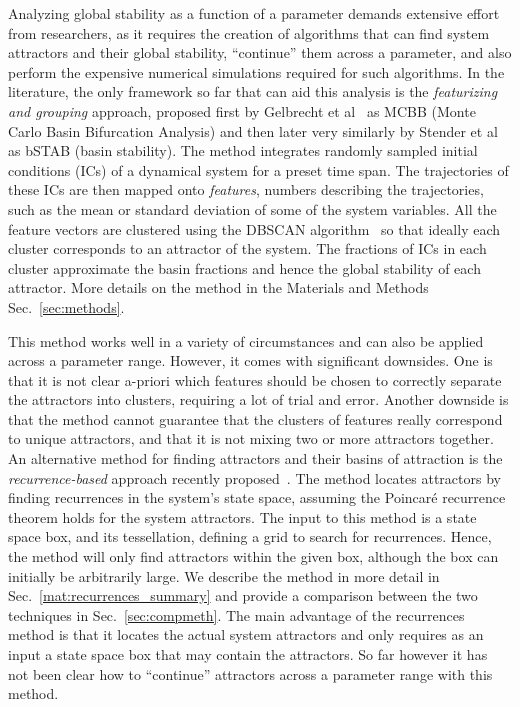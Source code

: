 \documentclass[%
 aip,
 amsmath,amssymb,
 reprint,%
]{revtex4-1}
\begin{document}
Analyzing global stability as a function of a parameter demands extensive effort from researchers, as it requires the creation of algorithms that can find system attractors and their global stability, ``continue'' them across a parameter, and also perform the expensive numerical simulations required for such algorithms. In the literature, the only framework so far that can aid this analysis is the \emph{featurizing and grouping} approach, proposed first by Gelbrecht et al~\cite{Gelbrecht2020} as MCBB (Monte Carlo Basin Bifurcation Analysis) and then later very similarly by Stender et al~\cite{Stender2021} as bSTAB (basin stability). The method integrates randomly sampled initial conditions (ICs) of a dynamical system for a preset time span. The trajectories of these ICs are then mapped onto \emph{features}, numbers describing the trajectories, such as the mean or standard deviation of some of the system variables. All the feature vectors are clustered using the DBSCAN algorithm~\cite{Ester1996} so that ideally each cluster corresponds to an attractor of the system. The fractions of ICs in each cluster approximate the basin fractions and hence the global stability of each attractor. More details on the method in the Materials and Methods Sec.~\ref{sec:methods}.

This method works well in a variety of circumstances and can also be applied across a parameter range. However, it comes with significant downsides. One is that it is not clear a-priori which features should be chosen to correctly separate the attractors into clusters, requiring a lot of trial and error. Another downside is that the method cannot guarantee that the clusters of features really correspond to unique attractors, and that it is not mixing two or more attractors together.
An alternative method for finding attractors and their basins of attraction is the \emph{recurrence-based} approach recently proposed~\cite{DatserisWagemakers2022}. The method locates attractors by finding recurrences in the system's state space, assuming the Poincar\'e recurrence theorem holds for the system attractors. The input to this method is a state space box, and its tessellation, defining a grid to search for recurrences. Hence, the method will only find attractors within the given box, although the box can initially be arbitrarily large.
We describe the method in more detail in Sec.~\ref{mat:recurrences_summary} and provide a comparison between the two techniques in Sec.~\ref{sec:compmeth}. The main advantage of the recurrences method is that it locates the actual system attractors and only requires as an input a state space box that may contain the attractors. So far however it has not been clear how to ``continue'' attractors across a parameter range with this method.
\end{document}
